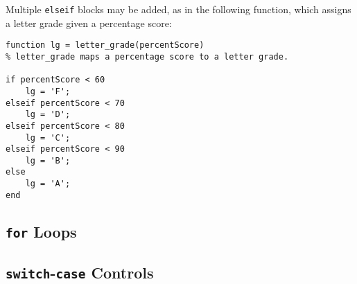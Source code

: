 Multiple \texttt{elseif} blocks may be added, as in the following function, which assigns a letter grade given a percentage score:
\begin{lstlisting}[style=Matlab-editor]
function lg = letter_grade(percentScore)
% letter_grade maps a percentage score to a letter grade.

if percentScore < 60
    lg = 'F';
elseif percentScore < 70
    lg = 'D';
elseif percentScore < 80
    lg = 'C';
elseif percentScore < 90
    lg = 'B';
else
    lg = 'A';
end
\end{lstlisting}

\subsection{\texttt{for} Loops}

\subsection{\texttt{switch}-\texttt{case} Controls} \label{appendix:switch_case}


